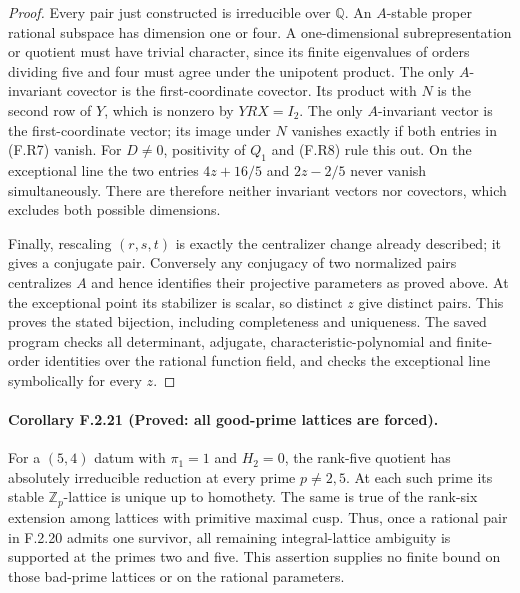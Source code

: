\begin{proof}
Every pair just constructed is irreducible over $\mathbb Q$.
An $A$-stable proper rational subspace has dimension one or
four.  A one-dimensional subrepresentation or quotient must
have trivial character, since its finite eigenvalues of
orders dividing five and four must agree under the
unipotent product.  The only $A$-invariant covector is the
first-coordinate covector.  Its product with $N$ is the
second row of $Y$, which is nonzero by $YRX=I_2$.
The only $A$-invariant vector is the first-coordinate vector;
its image under $N$ vanishes exactly if both entries in
(F.R7) vanish.  For $D\ne0$, positivity of $Q_1$ and
(F.R8) rule this out.  On the exceptional line the two
entries $4z+16/5$ and $2z-2/5$ never vanish simultaneously.
There are therefore neither invariant vectors nor covectors,
which excludes both possible dimensions.

Finally, rescaling $(r,s,t)$ is exactly the centralizer
change already described; it gives a conjugate pair.
Conversely any conjugacy of two normalized pairs centralizes
$A$ and hence identifies their projective parameters as proved
above.  At the exceptional point its stabilizer is scalar,
so distinct $z$ give distinct pairs.  This proves the stated
bijection, including completeness and uniqueness.
The saved program checks all determinant, adjugate,
characteristic-polynomial and finite-order identities over
the rational function field, and checks the exceptional
line symbolically for every $z$.
\end{proof}

\paragraph{Corollary F.2.21 (Proved: all good-prime lattices are forced).}
For a $(5,4)$ datum with $\pi_1=1$ and $H_2=0$, the
rank-five quotient has absolutely irreducible reduction
at every prime $p\ne2,5$.  At each such prime its stable
$\mathbb Z_p$-lattice is unique up to homothety.
The same is true of the rank-six extension among lattices
with primitive maximal cusp.  Thus, once a rational pair
in F.2.20 admits one survivor, all remaining integral-lattice
ambiguity is supported at the primes two and five.
This assertion supplies no finite bound on those bad-prime
lattices or on the rational parameters.

